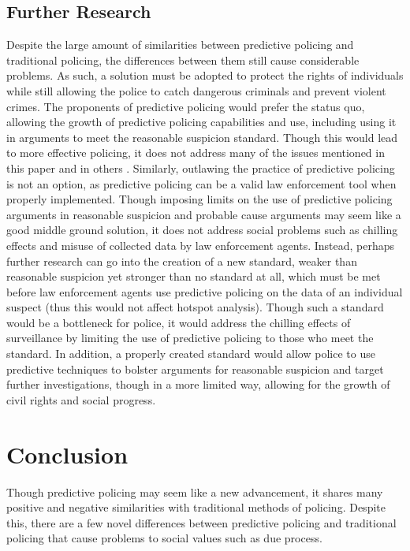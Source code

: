 \documentclass[12pt]{article} %
\begin{document}
\subsection{Further Research}
Despite the large amount of similarities between predictive policing and traditional policing, the differences between them still cause considerable problems. As such, a solution must be adopted to protect the rights of individuals while still allowing the police to catch dangerous criminals and prevent violent crimes. The proponents of predictive policing would prefer the status quo, allowing the growth of predictive policing capabilities and use, including using it in arguments to meet the reasonable suspicion standard. \cite{joh2014policing} Though this would lead to more effective policing, it does not address many of the issues mentioned in this paper and in others \cite{ferguson2012predictive}. Similarly, outlawing the practice of predictive policing is not an option, as predictive policing can be a valid law enforcement tool when properly implemented. Though imposing limits on the use of predictive policing arguments in reasonable suspicion and probable cause arguments may seem like a good middle ground solution, it does not address social problems such as chilling effects and misuse of collected data by law enforcement agents. Instead, perhaps further research can go into the creation of a new standard, weaker than reasonable suspicion yet stronger than no standard at all, which must be met before law enforcement agents use predictive policing on the data of an individual suspect (thus this would not affect hotspot analysis). Though such a standard would be a bottleneck for police, it would address the chilling effects of surveillance by limiting the use of predictive policing to those who meet the standard. In addition, a properly created standard would allow police to use predictive techniques to bolster arguments for reasonable suspicion and target further investigations, though in a more limited way, allowing for the growth of civil rights and social progress.  
  
\section{Conclusion}\label{sec:conclusion}
Though predictive policing may seem like a new advancement, it shares many positive and negative similarities with traditional methods of policing. Despite this, there are a few novel differences between predictive policing and traditional policing that cause problems to social values such as due process.
\end{document}

